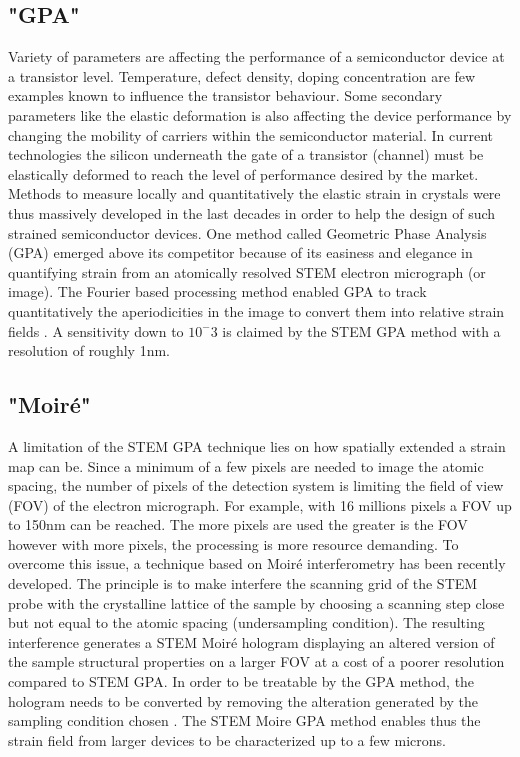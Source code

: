 \documentclass{article}
\begin{document}
\subsection{"GPA"}
Variety of parameters are affecting the performance of a semiconductor device at a transistor level. Temperature, defect density, doping concentration are few examples known to influence the transistor behaviour. Some secondary parameters like the elastic deformation is also affecting the device performance by changing the mobility of carriers within the semiconductor material. In current technologies the silicon underneath the gate of a transistor (channel) must be elastically deformed to reach the level of performance desired by the market. Methods to measure locally and quantitatively the elastic strain in crystals were thus massively developed in the last decades in order to help the design of such strained semiconductor devices. One method called Geometric Phase Analysis (GPA) emerged above its competitor because of its easiness and elegance in quantifying strain from an atomically resolved STEM electron micrograph (or image). The Fourier based processing method enabled GPA to track quantitatively the aperiodicities in the image to convert them into relative strain fields \cite{Hytch1998}. A sensitivity down to $10^-{3}$ is claimed by the STEM GPA method with a resolution of roughly 1nm.
\subsection{"Moir{\'e}"}
A limitation of the STEM GPA technique lies on how spatially extended a strain map can be. Since a minimum of a few pixels are needed to image the atomic spacing, the number of pixels of the detection system is limiting the field of view (FOV) of the electron micrograph. For example, with 16 millions pixels a FOV up to 150nm can be reached. The more pixels are used the greater is the FOV however with more pixels, the processing is more resource demanding. To overcome this issue, a technique based on Moir{\'e} interferometry has been recently developed. The principle is to make interfere the scanning grid of the STEM probe with the crystalline lattice of the sample by choosing a scanning step close but not equal to the atomic spacing (undersampling condition). The resulting interference generates a STEM Moir{\'e }hologram displaying an altered version of the sample structural properties on a larger FOV at a cost of a poorer resolution compared to STEM GPA. In order to be treatable by the GPA method, the hologram needs to be converted by removing the alteration generated by the sampling condition chosen \cite{Pofelski2017}. The STEM Moire GPA method enables thus the strain field from larger devices to be characterized up to a few microns.
\end{document}
